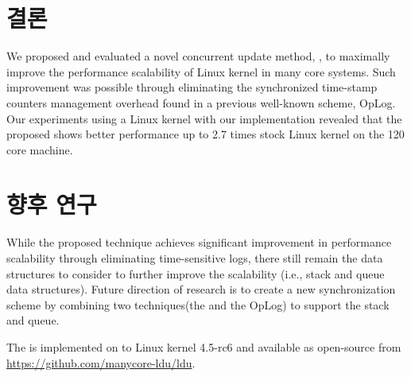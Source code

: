 \section{결론}
\label{sec:concl}
We proposed and evaluated a novel concurrent update method, \LDU, 
to maximally improve the performance scalability of Linux kernel 
in many core systems. 
Such improvement was possible through eliminating the 
synchronized time-stamp counters management overhead 
found in a previous well-known scheme, OpLog.
Our experiments using a Linux kernel with our \LDU implementation
revealed that the proposed \LDU shows better performance up to 2.7 times
stock Linux kernel on the 120 core machine.

\section{향후 연구}
While the proposed technique achieves significant improvement
in performance scalability through eliminating time-sensitive
logs, there still remain the data structures to consider to further
improve the scalability (i.e., stack and queue data structures).
Future direction of research is to create a new synchronization scheme by combining 
two techniques(the \LDU and the OpLog) to support the stack and queue.

The \LDU is implemented on to Linux kernel 4.5-rc6 and available as open-source
from \url{https://github.com/manycore-ldu/ldu}.

